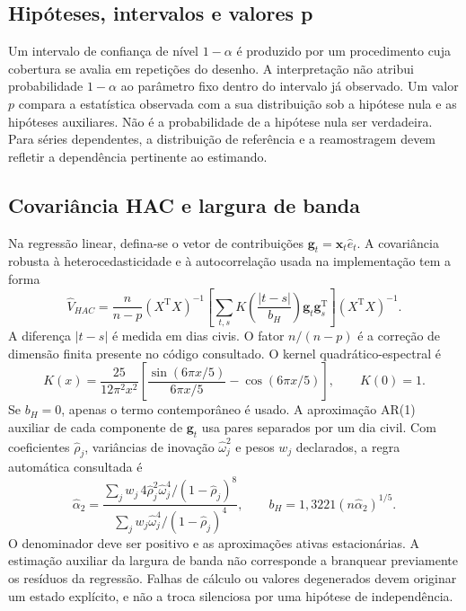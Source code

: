 \subsection{Hipóteses, intervalos e valores p}
\label{sec:mat-interpretacao-inferencia}
Um intervalo de confiança de nível $1-\alpha$ é produzido por um procedimento cuja cobertura se avalia em repetições do desenho. A interpretação não atribui probabilidade $1-\alpha$ ao parâmetro fixo dentro do intervalo já observado. Um valor $p$ compara a estatística observada com a sua distribuição sob a hipótese nula e as hipóteses auxiliares. Não é a probabilidade de a hipótese nula ser verdadeira. Para séries dependentes, a distribuição de referência e a reamostragem devem refletir a dependência pertinente ao estimando.

\subsection{Covariância HAC e largura de banda}
\label{sec:mat-hac}
Na regressão linear, defina-se o vetor de contribuições $\boldsymbol g_t=\boldsymbol x_t\widehat e_t$. A covariância robusta à heterocedasticidade e à autocorrelação usada na implementação tem a forma~\parencite{NeweyWest1987,Andrews1991}
\begin{equation}
\widehat V_{HAC}=\frac{n}{n-p}(X^{\mathrm T}X)^{-1}
\left[\sum_{t,s}K\!\left(\frac{|t-s|}{b_H}\right)
\boldsymbol g_t\boldsymbol g_s^{\mathrm T}\right](X^{\mathrm T}X)^{-1}.
\label{eq:mat-hac}
\end{equation}
A diferença $|t-s|$ é medida em dias civis. O fator $n/(n-p)$ é a correção de dimensão finita presente no código consultado. O kernel quadrático-espectral é
\begin{equation}
K(x)=\frac{25}{12\pi^2x^2}
\left[\frac{\sin(6\pi x/5)}{6\pi x/5}-\cos(6\pi x/5)\right],
\qquad K(0)=1.
\label{eq:mat-qs}
\end{equation}
Se $b_H=0$, apenas o termo contemporâneo é usado. A aproximação AR(1) auxiliar de cada componente de $\boldsymbol g_t$ usa pares separados por um dia civil. Com coeficientes $\widehat\rho_j$, variâncias de inovação $\widehat\omega_j^2$ e pesos $w_j$ declarados, a regra automática consultada é
\begin{equation}
\widehat\alpha_2=
\frac{\sum_jw_j\,4\widehat\rho_j^2\widehat\omega_j^4/(1-\widehat\rho_j)^8}
{\sum_jw_j\widehat\omega_j^4/(1-\widehat\rho_j)^4},
\qquad b_H=1{,}3221(n\widehat\alpha_2)^{1/5}.
\label{eq:mat-andrews}
\end{equation}
O denominador deve ser positivo e as aproximações ativas estacionárias. A estimação auxiliar da largura de banda não corresponde a branquear previamente os resíduos da regressão. Falhas de cálculo ou valores degenerados devem originar um estado explícito, e não a troca silenciosa por uma hipótese de independência.

